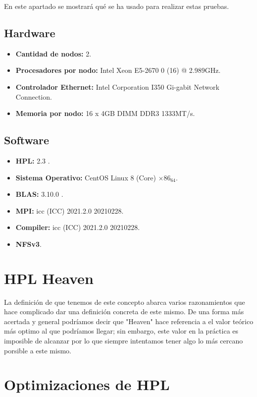 \documentclass[conference]{IEEEtran}
\begin{document}
En este apartado se mostrará qué se ha usado para realizar estas pruebas.

\subsection{Hardware}

\begin{itemize}
    \item \textbf{Cantidad de nodos:} 2.
    \item \textbf{Procesadores por nodo:} Intel Xeon E5-2670 0 (16) @ 2.989GHz.
    \item \textbf{Controlador Ethernet:} Intel Corporation I350 Gi-gabit Network Connection.
    \item \textbf{Memoria por nodo:} 16 x 4GB DIMM DDR3 1333MT/s.
\end{itemize}

\subsection{Software}

\begin{itemize}
    \item \textbf{HPL:} 2.3 \cite{1}.
    \item \textbf{Sistema Operativo:} CentOS Linux 8 (Core) \( \times86_64\).
    \item \textbf{BLAS:} 3.10.0 \cite{2}.
    \item \textbf{MPI:} icc (ICC) 2021.2.0 20210228.
    \item \textbf{Compiler:} icc (ICC) 2021.2.0 20210228.
    \item \textbf{NFSv3}.
\end{itemize}

\section{HPL Heaven}
La definición de que tenemos de este concepto abarca varios razonamientos
que hace complicado dar una definición concreta de este mismo. De una forma 
más acertada y general podríamos decir que "Heaven" hace referencia a el valor teórico 
más optimo al que podríamos llegar; sin embargo, este valor en la práctica es imposible 
de alcanzar por lo que siempre intentamos tener algo lo más cercano porsible a este mismo.

\section{Optimizaciones de HPL}
\end{document}
